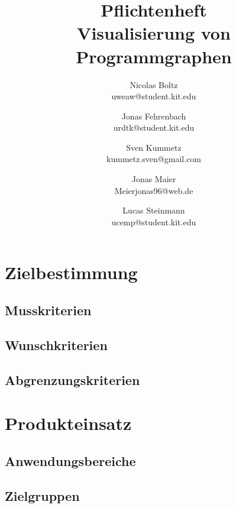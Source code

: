 \documentclass[a4paper]{scrreprt}
\begin{document}
\title{Pflichtenheft\\
Visualisierung von Programmgraphen}
\date{}
\author{Nicolas Boltz   \\ uweaw@student.kit.edu
  \and Jonas Fehrenbach \\ urdtk@student.kit.edu
  \and Sven Kummetz     \\ kummetz.sven@gmail.com
  \and Jonas Maier      \\ Meierjonas96@web.de
  \and Lucas Steinmann  \\ ucemp@student.kit.edu
}
\maketitle


\tableofcontents

\chapter{Zielbestimmung}
\section{Musskriterien}

\section{Wunschkriterien}

\section{Abgrenzungskriterien}

\chapter{Produkteinsatz}

\section{Anwendungsbereiche}

\section{Zielgruppen}
\end{document}
